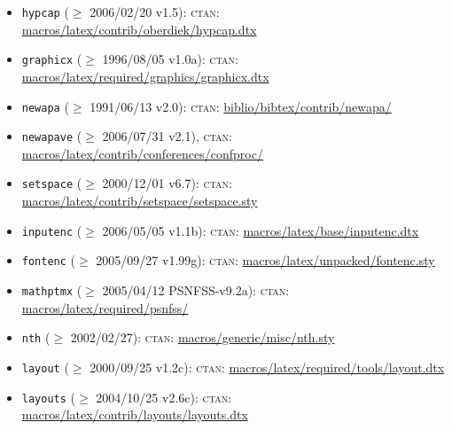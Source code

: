 \documentclass{article}
\newcommand{\ctan}{\textsc{ctan}}
\newcommand{\package}[1]{\texttt{#1}}
\begin{document}
\begin{itemize}
  \item \package{hypcap}
             ($\ge$ 2006/02/20 v1.5):
    \ctan:  \href{http://www.ctan.org/tex-archive/macros/latex/contrib/oberdiek/hypcap.dtx}{macros/latex/contrib/oberdiek/hypcap.dtx}
	         \item \package{graphicx}
             ($\ge$ 1996/08/05 v1.0a):
    \ctan: \href{http://www.ctan.org/tex-archive/macros/latex/required/graphics/graphicx.dtx}{macros/latex/required/graphics/graphicx.dtx}
  \item \package{newapa}
             ($\ge$ 1991/06/13 v2.0):
    \ctan:  \href{http://www.ctan.org/tex-archive/biblio/bibtex/contrib/newapa/}{biblio/bibtex/contrib/newapa/}\
  \item \package{newapave}
             ($\ge$ 2006/07/31 v2.1),   
    \ctan:  \href{http://www.ctan.org/tex-archive/macros/latex/contrib/conferences/confproc/}{macros/latex/contrib/conferences/confproc/}
   \item \package{setspace}
             ($\ge$ 2000/12/01 v6.7):
    \ctan:  \href{http://www.ctan.org/tex-archive/macros/latex/contrib/setspace/setspace.sty}{macros/latex/contrib/setspace/setspace.sty}
   \item \package{inputenc}
             ($\ge$ 2006/05/05 v1.1b):
 	        \ctan:  \href{http://www.ctan.org/tex-archive/macros/latex/base/inputenc.dtx}{macros/latex/base/inputenc.dtx}
   \item \package{fontenc}
             ($\ge$ 2005/09/27 v1.99g): 
 	        \ctan:  \href{http://www.ctan.org/tex-archive/macros/latex/unpacked/fontenc.sty}{macros/latex/unpacked/fontenc.sty}
		  \item \package{mathptmx} 
             ($\ge$ 2005/04/12 PSNFSS-v9.2a):
     \ctan:  \href{http://www.ctan.org/tex-archive/macros/latex/required/psnfss/}{macros/latex/required/psnfss/}
   		  \item \package{nth} 
             ($\ge$ 2002/02/27):
     \ctan:  \href{http://www.ctan.org/tex-archive/macros/generic/misc/nth.sty}{macros/generic/misc/nth.sty}
   \item \package{layout}
             ($\ge$ 2000/09/25 v1.2c):
     \ctan:  \href{http://www.ctan.org/tex-archive/macros/latex/required/tools/layout.dtx}{macros/latex/required/tools/layout.dtx}
   \item \package{layouts}
             ($\ge$ 2004/10/25 v2.6c):
 	           \ctan:  \href{http://www.ctan.org/tex-archive/macros/latex/contrib/layouts/layouts.dtx}{macros/latex/contrib/layouts/layouts.dtx}
\end{itemize}
\end{document}
